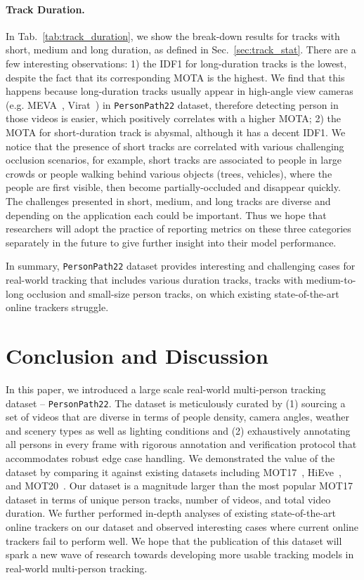 \documentclass[runningheads]{llncs}
\begin{document}
\paragraph{\textbf{Track Duration.}} 
In Tab.~\ref{tab:track_duration}, we show the break-down results for tracks with short, medium and long duration, as defined in Sec.~\ref{sec:track_stat}. There are a few interesting observations: 1) the IDF1 for long-duration tracks is the lowest, despite the fact that its corresponding MOTA is the highest. We find that this happens because long-duration tracks usually appear in high-angle view cameras (e.g. MEVA~\cite{meva}, Virat~\cite{virat}) in \texttt{PersonPath22} dataset, therefore detecting person in those videos is easier, which positively correlates with a higher MOTA; 2) the MOTA for short-duration track is abysmal, although it has a decent IDF1. We notice that the presence of short tracks are correlated with various challenging occlusion scenarios, for example, short tracks are associated to people in large crowds or people walking behind various objects (trees, vehicles), where the people are first visible, then become partially-occluded and disappear quickly.
The challenges presented in short, medium, and long tracks are diverse and depending on the application each could be important. Thus we hope that researchers will adopt the practice of reporting metrics on these three categories separately in the future to give further insight into their model performance.


In summary, \texttt{PersonPath22} dataset provides interesting and challenging cases for real-world tracking that includes various duration tracks, tracks with medium-to-long occlusion and small-size person tracks, on which existing state-of-the-art online trackers struggle. 








%
 
\section{Conclusion and Discussion}
In this paper, we introduced a large scale real-world multi-person tracking dataset -- \texttt{PersonPath22}. The dataset is meticulously curated by (1) sourcing a set of videos that are diverse in terms of people density, camera angles, weather and scenery types as well as lighting conditions and (2) exhaustively annotating all persons in every frame with rigorous annotation and verification protocol that accommodates robust edge case handling. We demonstrated the value of the dataset by comparing it against existing datasets including MOT17~\cite{mot}, HiEve~\cite{hieve}, and MOT20~\cite{mot20}. Our dataset is a magnitude larger than the most popular MOT17 dataset in terms of unique person tracks, number of videos, and total video duration. We further performed in-depth analyses of existing state-of-the-art online trackers on our dataset and observed interesting cases where current online trackers fail to perform well. We hope that the publication of this dataset will spark a new wave of research towards developing more usable tracking models in real-world multi-person tracking. 
\end{document}
